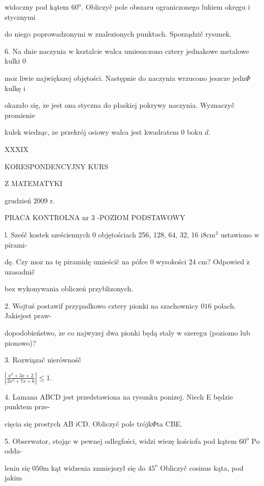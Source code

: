 \documentclass[a4paper,12pt]{article}
\begin{document}
widoczny pod kątem $60^{\mathrm{o}}$. Obliczyč pole obszaru ograniczonego lukiem okręgu $\mathrm{i}$ stycznymi

do niego poprowadzonymi $\mathrm{w}$ znalezionych punktach. Sporządzič rysunek.

6. Na dnie naczynia $\mathrm{w}$ ksztalcie walca umieszczono cztery jednakowe metalowe kulki $0$

$\mathrm{m}\mathrm{o}\dot{\mathrm{z}}$ liwie największej objętości. Następnie do naczynia wrzucono jeszcze $\mathrm{j}\mathrm{e}\mathrm{d}\mathrm{n}\Phi$ kulkę $\mathrm{i}$

okazało się, $\dot{\mathrm{z}}\mathrm{e}$ jest ona styczna do płaskiej pokrywy naczynia. Wyznaczyč promienie

kulek wiedząc, $\dot{\mathrm{z}}\mathrm{e}$ przekrój osiowy walca jest kwadratem $0$ boku $d.$





XXXIX

KORESPONDENCYJNY KURS

Z MATEMATYKI

grudzień 2009 r.

PRACA KONTROLNA nr 3 -POZIOM PODSTAWOWY

l. Sześč kostek sześciennych $0$ objętościach 256, 128, 64, 32, 16 $\mathrm{i}8\mathrm{c}\mathrm{m}^{3}$ ustawiono $\mathrm{w}$ pirami-

dę. Czy $\mathrm{m}\mathrm{o}\dot{\mathrm{z}}$ na tę piramidę umieścič na pófce $0$ wysokości 24 cm? Odpowied $\acute{\mathrm{z}}$ uzasadnič

bez wykonywania obliczeń przyblizonych.

2. Wojtuś postawif przypadkowo cztery pionki na szachownicy $016$ polach. Jakiejest praw-

dopodobieństwo, $\dot{\mathrm{z}}\mathrm{e}$ co najwyzej dwa pionki będą staly $\mathrm{w}$ szeregu (poziomo lub pionowo)?

3. Rozwiązač nierównośč

$|\displaystyle \frac{x^{2}+3x+2}{2x^{2}+7x+6}|\leq 1.$

4. Lamana ABCD jest przedstawiona na rysunku ponizej. Niech E będzie punktem prze-

cięcia się prostych AB iCD. Obliczyč pole trójk$\Phi$ta CBE.

5. Obserwator, stojąc $\mathrm{w}$ pewnej odlegfości, widzi wiezę kościofa pod kątem $60^{\mathrm{o}}$ Po odda-

leniu się $050\mathrm{m}$ kąt widzenia zmniejszył się do $45^{\mathrm{o}}$ Obliczyč cosinus kąta, pod jakim
\end{document}
